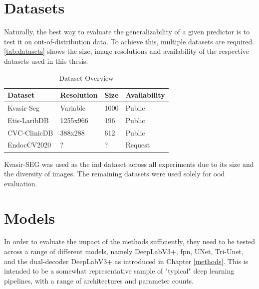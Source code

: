 \section{Datasets}
Naturally, the best way to evaluate the generalizability of a given predictor is to test it on out-of-distribution data. To achieve this, multiple datasets are required. \autoref{tab:datasets} shows the size, image resolutions and availability of the respective datasets used in this thesis.

\begin{table}[h]
    \centering
   \begin{tabularx}{\linewidth}{XXXX}
    \toprule
    Dataset & Resolution & Size & Availability \\
    \midrule
    Kvasir-Seg \cite{kvasir} & Variable & 1000 & Public \\
    Etis-LaribDB & 1255x966 & 196  & Public \\
    CVC-ClinicDB & 388x288 & 612  & Public \\
    EndocCV2020 & ? & ?  & Request \\
    \bottomrule
\end{tabularx}
    \caption{Dataset Overview}
    \label{tab:datasets}
\end{table}


Kvasir-SEG was used as the \gls{ind} dataset across all experiments due to its size and the diversity of images. The remaining datasets were used solely for \gls{ood} evaluation. 

\section{Models}
In order to evaluate the impact of the methods sufficiently, they need to be tested across a range of different models, namely DeepLabV3+, \gls{fpn}, UNet, Tri-Unet, and the dual-decoder DeepLabV3+ as introduced in Chapter \ref{methods}. This is intended to be a somewhat representative sample of "typical" deep learning pipelines, with a range of architectures and parameter counts. 
        
